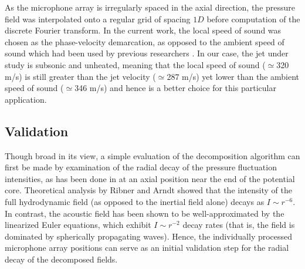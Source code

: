 As the microphone array is irregularly spaced in the axial direction, the pressure field was interpolated onto a regular grid of spacing $1D$ before computation of the discrete Fourier transform. 
In the current work, the local speed of sound was chosen as the phase-velocity demarcation, as opposed to the ambient speed of sound which had been used by previous researchers \citep{Tinney2008}. 
In our case, the jet under study is subsonic and unheated, meaning that the local speed of sound ($\simeq$320 m/s) is still greater than the jet velocity ($\simeq$287 m/s) yet lower than the ambient speed of sound ($\simeq$346 m/s) and hence is a better choice for this particular application.
\subsection{Validation}
Though broad in its view, a simple evaluation of the decomposition algorithm can first be made by examination of the radial decay of the pressure fluctuation intensities, as has been done in   at an axial position near the end of the potential core. 
Theoretical analysis by Ribner \citep{Ribner1962} and Arndt \etal \citep{Arndt1997} showed that the intensity of the full hydrodynamic field (as opposed to the inertial field alone) decays as $I \sim r^{-6}$. 
In contrast, the acoustic field has been shown to be well-approximated by the linearized Euler equations, which exhibit $I \sim r^{-2}$ decay rates (that is, the field is dominated by spherically propagating waves). 
Hence, the individually processed microphone array positions can serve as an initial validation step for the radial decay of the decomposed fields.

